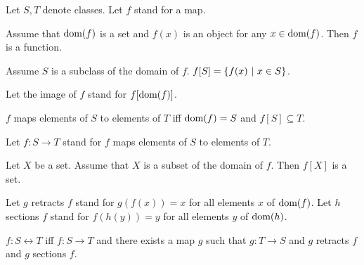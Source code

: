 \documentclass[11pt]{article}
\begin{document}
\begin{forthel}
  Let $S, T$ denote classes.
  Let $f$ stand for a map.

  \begin{axiom}
    Assume that $\textrm{dom}(f)$ is a set and $f(x)$ is an object for any
    $x \in \textrm{dom}(f)$.
    Then $f$ is a function.
  \end{axiom}

  \begin{definition}
    Assume $S$ is a subclass of the domain of $f$.
    $f[S] = \class{f(x) | x \in S}$.
  \end{definition}

  Let the image of $f$ stand for $f[\textrm{dom}(f)]$.

  \begin{definition}
    $f$ maps elements of $S$ to elements of $T$ iff $\textrm{dom}(f) = S$ and $f[S]
    \subseteq T$.
  \end{definition}

  Let $f : S \rightarrow T$ stand for $f$ maps elements of $S$ to elements of
  $T$.

  \begin{axiom}
    Let $X$ be a set.
    Assume that $X$ is a subset of the domain of $f$.
    Then $f[X]$ is a set.
  \end{axiom}

  Let $g$ retracts $f$ stand for $g(f(x)) = x$ for all elements $x$ of
  $\textrm{dom}(f)$.
  Let $h$ sections $f$ stand for $f(h(y)) = y$ for all elements $y$ of
  $\textrm{dom}(h)$.

  \begin{definition}
    $f : S \leftrightarrow T$ iff $f : S \rightarrow T$ and there exists a map
    $g$ such that $g : T \rightarrow S$ and $g$ retracts $f$ and $g$ sections
    $f$.
  \end{definition}
\end{forthel}
\end{document}
